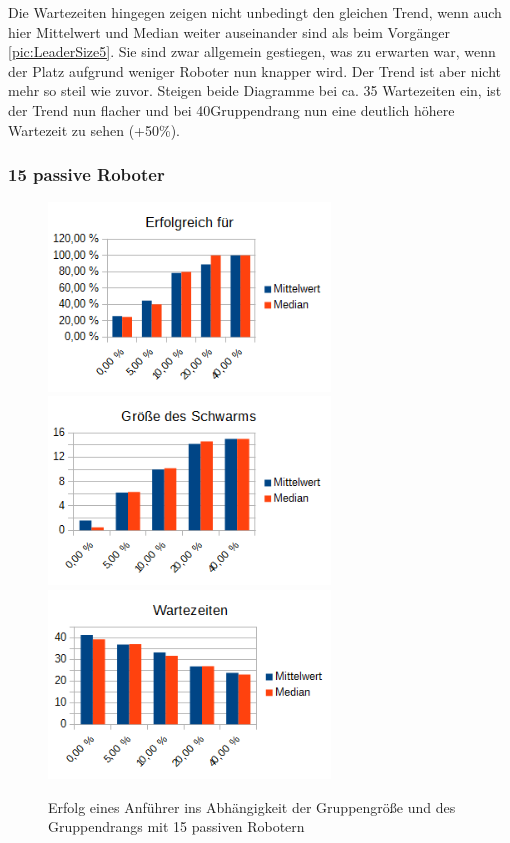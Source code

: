 Die Wartezeiten hingegen zeigen nicht unbedingt den gleichen Trend, wenn auch hier Mittelwert und Median weiter auseinander sind als beim Vorgänger \autoref{pic:LeaderSize5}. Sie sind zwar allgemein gestiegen, was zu erwarten war, wenn der Platz aufgrund weniger Roboter nun knapper wird. Der Trend ist aber nicht mehr so steil wie zuvor. Steigen beide Diagramme bei ca. 35 Wartezeiten ein, ist der Trend nun flacher und bei 40\per Gruppendrang nun eine deutlich höhere Wartezeit zu sehen (+50\%).

\newpage
\subsubsection*{15 passive Roboter}

\begin{figure}[h]
	\includegraphics[width=7.5cm, keepaspectratio]{graphics/Statistics/Leader/FlockSize/15_1.png}
	\includegraphics[width=7.5cm, keepaspectratio]{graphics/Statistics/Leader/FlockSize/15_2.png}
	\includegraphics[width=7.5cm, keepaspectratio]{graphics/Statistics/Leader/FlockSize/15_3.png}
	\caption{Erfolg eines Anführer ins Abhängigkeit der Gruppengröße und des Gruppendrangs mit 15 passiven Robotern}
	\label{pic:LeaderSize15}
\end{figure}

